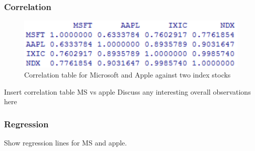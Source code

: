 \documentclass[paper=a4, fontsize=11pt]{scrartcl} %
\numberwithin{equation}{section} %
\numberwithin{figure}{section} %
\numberwithin{table}{section} %
\begin{document}
\subsubsection{Correlation}

\begin{figure}[!htb]
  \includegraphics[width=\linewidth]{graph/cor6.png}
  \caption{Correlation table for Microsoft and Apple against two index stocks}
\endminipage\hfill
\end{figure}

Insert correlation table MS vs apple
Discuss any interesting overall observations here

\subsubsection{Regression}
Show regression lines for MS and apple. 
\end{document}
